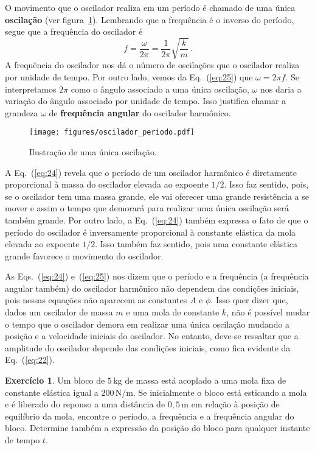 \documentclass[12pt,a4paper]{article}
\theoremstyle{definition}
\newtheorem{ex}{Exercício}[section]
\begin{document}
O movimento que o oscilador realiza em um período é chamado de uma
única \textbf{oscilação} (ver figura~\ref{fig:oscilador_periodo}). Lembrando que a frequência é o
inverso do período, segue que a frequência do oscilador é
\begin{equation}
  \label{eq:25}
  f=\frac{\omega}{2\pi}=\frac{1}{2\pi}\sqrt{\frac{k}{m}}\,.
\end{equation}
A frequência do oscilador nos dá o número de oscilações que o
oscilador realiza por unidade de tempo. Por outro lado, vemos da
Eq.~(\ref{eq:25}) que $\omega=2\pi f$. Se interpretamos $2\pi$ como o
ângulo associado a uma única oscilação, $\omega$ nos daria a variação
do ângulo associado por unidade de tempo. Isso justifica chamar a
grandeza $\omega$ de \textbf{frequência angular} do oscilador
harmônico.

\begin{figure}[t]
  \centering
  \texttt{[image: figures/oscilador\_periodo.pdf]}
  \caption{Ilustração de uma única oscilação.}
  \label{fig:oscilador_periodo}
\end{figure}

A Eq.~(\ref{eq:24}) revela que o período de um oscilador harmônico é
diretamente proporcional à massa do oscilador elevada ao expoente
$1/2$. Isso faz sentido, pois, se o oscilador tem uma massa grande,
ele vai oferecer uma grande resistência a se mover e assim o tempo que
demorará para realizar uma única oscilação será também grande. Por
outro lado, a Eq.~(\ref{eq:24}) também expressa o fato de que o
período do oscilador é inversamente proporcional à constante elástica
da mola elevada ao expoente $1/2$. Isso também faz sentido, pois uma
constante elástica grande favorece o movimento do oscilador.

As Eqs.~(\ref{eq:24}) e~(\ref{eq:25}) nos dizem que o período e a
frequência (a frequência angular também) do oscilador harmônico não
dependem das condições iniciais, pois nessas equações não aparecem as
constantes $A$ e $\phi$. Isso quer dizer que, dados um oscilador de
massa $m$ e uma mola de constante $k$, não é possível mudar o tempo
que o oscilador demora em realizar uma única oscilação mudando a
posição e a velocidade iniciais do oscilador. No entanto, deve-se
ressaltar que a amplitude do oscilador depende das condições iniciais,
como fica evidente da Eq.~(\ref{eq:22}).

\begin{ex}
  Um bloco de $5\,\mathrm{kg}$ de massa está acoplado a uma mola fixa
  de constante elástica igual a $200\,\mathrm{N/m}$. Se inicialmente o
  bloco está esticando a mola e é liberado do repouso a uma distância
  de $0{,}5\,\mathrm{m}$ em relação à posição de equilíbrio da mola,
  encontre o período, a frequência e a frequência angular do
  bloco. Determine também a expressão da posição do bloco para
  qualquer instante de tempo $t$.
\end{ex}
\end{document}
